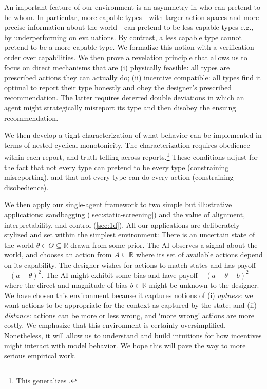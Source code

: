 \documentclass[12pt,reqno]{article}
\theoremstyle{definition} \newtheorem{example}{Example}
\theoremstyle{definition} \newtheorem{condition}{Condition}
\theoremstyle{definition} \newtheorem{corollary}{Corollary}
\theoremstyle{definition} \newtheorem{claim}{Claim}
\theoremstyle{definition} \newtheorem{definition}{Definition}
\theoremstyle{definition} \newtheorem{conjecture}{Conjecture}
\theoremstyle{definition} \newtheorem{Lemma}{Lemma}
\theoremstyle{definition} \newtheorem{lemma}{Lemma}
\theoremstyle{plain} \newtheorem{theorem}{Theorem}
\theoremstyle{definition} \newtheorem{assumption}{Assumption}
\theoremstyle{definition} \newtheorem*{assumptionnonumber}{Assumption}
\theoremstyle{definition} \newtheorem*{theoremNoNumber}{Proposition}
\theoremstyle{definition}\newtheorem{proposition}{Proposition}
\theoremstyle{definition} \newtheorem{observation}{Observation}
\theoremstyle{definition} \newtheorem*{definitionNoNumber}{Definition}
\theoremstyle{definition} \newtheorem{Definition}{Definition}
\theoremstyle{definition} \newtheorem*{DefinitionNoNumber}{Definition}
\theoremstyle{definition} \newtheorem*{fact}{Fact}
\theoremstyle{definition} \newtheorem*{property}{Property}
\theoremstyle{definition} \newtheorem{remark}{Remark}
\theoremstyle{definition}\newtheorem{romanexampleinner}{Example}
\begin{document}
An important feature of our environment is an asymmetry in who can pretend to be whom. In particular, more capable types---with larger action spaces and more precise information about the world---can pretend to be less capable types e.g., by underperforming on evaluations. By contrast, a less capable type cannot pretend to be a more capable type. We formalize this notion with a verification order \citep{green1986partially} over capabilities. We then prove a revelation principle that allows us to focus on direct mechanisms that are (i) physically feasible: all types are prescribed actions they can actually do; (ii) incentive compatible: all types find it optimal to report their type honestly and obey the designer's prescribed recommendation. The latter requires deterred double deviations in which an agent might strategically misreport its type and then disobey the ensuing recommendation. 

We then develop a tight characterization of what behavior can be implemented in terms of nested cyclical monotonicity. The characterization requires obedience within each report, and truth-telling across reports.\footnote{This generalizes \citet{rochet1987}.} These conditions adjust for the fact that not every type can pretend to be every type (constraining misreporting), and that not every type can do every action (constraining disobedience). 

We then apply our single-agent framework to two simple but illustrative applications: sandbagging (\cref{sec:static-screening}) and the value of alignment, interpretability, and control (\cref{sec:1d}). All our applications are deliberately stylized and set within the simplest environment: There is an uncertain state of the world $\theta \in \Theta \subseteq \mathbb{R}$ drawn from some prior. The AI observes a signal about the world, and chooses an action from $A \subseteq \mathbb{R}$ where its set of available actions depend on its capability. The designer wishes for actions to match states and has payoff $-(a - \theta)^2$. The AI might exhibit some bias and have payoff $- (a - \theta - b)^2$ where the direct and magnitude of bias $b \in \mathbb{R}$ might be unknown to the designer. We have chosen this environment because it captures notions of (i) \emph{aptness}: we want actions to be appropriate for the context as captured by the state; and (ii) \emph{distance}: actions can be more or less wrong, and `more wrong' actions are more costly. We emphasize that this environment is certainly oversimplified. Nonetheless, it will allow us to understand and build intuitions for how incentives might interact with model behavior. We hope this will pave the way to more serious empirical work. 
\end{document}
